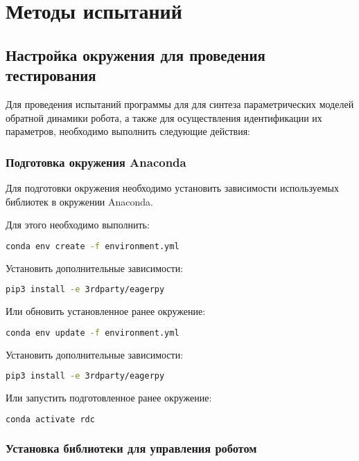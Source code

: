 \newpage
\section{Методы испытаний}

\subsection{Настройка окружения для проведения тестирования} \label{reqtest:setup}
Для проведения испытаний программы \productnamesecond для для синтеза параметрических моделей обратной динамики робота, а также для осуществления идентификации их параметров, необходимо выполнить следующие действия:


\subsubsection{Подготовка окружения Anaconda}

Для подготовки окружения необходимо установить зависимости используемых библиотек в окружении Anaconda.

Для этого необходимо выполнить:
\begin{lstlisting}[language=bash, numbers=none, frame=single]
    conda env create -f environment.yml
\end{lstlisting}

Установить дополнительные зависимости:
\begin{lstlisting}[language=bash, numbers=none, frame=single]
    pip3 install -e 3rdparty/eagerpy
\end{lstlisting}

Или обновить установленное ранее окружение:
\begin{lstlisting}[language=bash, numbers=none, frame=single]
    conda env update -f environment.yml
\end{lstlisting}

Установить дополнительные зависимости:
\begin{lstlisting}[language=bash, numbers=none, frame=single]
    pip3 install -e 3rdparty/eagerpy
\end{lstlisting}

Или запустить подготовленное ранее окружение:
\begin{lstlisting}[language=bash, numbers=none, frame=single]
    conda activate rdc
\end{lstlisting}

\subsubsection{Установка библиотеки для управления роботом}

